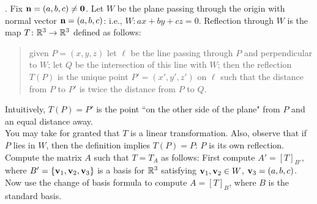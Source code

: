 . Fix ${\mathbf n}=(a,b,c)\ne {\mathbf 0}$. Let $W$ be the plane passing through the origin with normal vector ${\mathbf n}=(a,b,c)$: i.e., $W: ax+by+cz=0$. Reflection through $W$ is the map $T\colon{\mathbb R}^3\rightarrow{\mathbb R}^3$ defined as follows: 
\begin{quote}given $P=(x,y,z)$ let $\ell$ be the line passing through $P$ and perpendicular to $W$; let $Q$ be the intersection of this line with $W$; then the reflection $T(P)$ is the unique point $P'=(x',y',z')$ on $\ell$ such that the distance from $P$ to $P'$ is twice the distance from $P$ to $Q$. 
\end{quote}
Intuitively, $T(P)=P'$ is the point ``on the other side of the plane" from $P$ and an equal distance away. 
\\
You may take for granted that $T$ is a linear transformation. Also, observe that if $P$ lies in $W$, then the definition implies $T(P)=P$: $P$ is its own reflection. 
\\
Compute the matrix $A$ such that $T=T_A$ as follows: 
\bb
\ii First compute $A'=[T]_{B'}$, where $B'=\{{\mathbf v}_1,{\mathbf v}_2,{\mathbf v}_3\}$ is a basis for ${\mathbb R}^3$ satisfying ${\mathbf v}_1, {\mathbf v}_2\in W$, ${\mathbf v}_3=(a,b,c)$.
\ii Now use the change of basis formula to compute $A=[T]_B$, where $B$ is the standard basis. 
\ee
